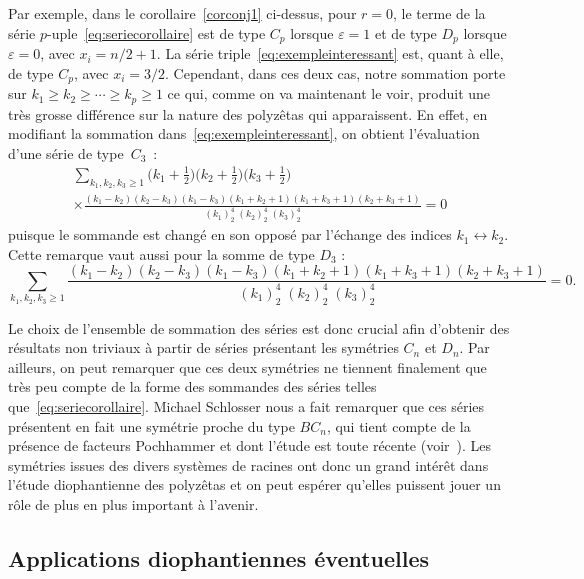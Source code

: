 \documentclass[12pt,francais, reqno]{smfart}
\numberwithin{equation}{section}
\begin{document}
Par exemple, dans le corollaire~\ref{corconj1} ci-dessus, pour $r=0$, le terme de
la s\'erie $p$-uple~\eqref{eq:seriecorollaire} est de type $C_p$ lorsque $\varepsilon=1$ et de type $D_p$ lorsque $\varepsilon=0$, avec $x_i=n/2+1$. La s\'erie triple~\eqref{eq:exempleinteressant} est, quant 
\`a elle, de type $C_p$, avec $x_i=3/2$.
Cependant, dans ces deux cas, notre sommation porte sur 
$k_1 \ge k_2\ge \cdots \ge k_p\ge 1$ ce qui, comme on va maintenant le voir, produit 
une tr\`es grosse diff\'erence sur la nature des polyz\^etas qui apparaissent. En effet, en modifiant la sommation dans~\eqref{eq:exempleinteressant}, on obtient l'\'evaluation d'une s\'erie de type~$C_3$~:
\begin{multline*}\label{eq:exempleinteressantbis}
\sum_{k_1, k_2, k_3\ge 1}\big(k_1+\frac12\big)\big(k_2+ \frac12\big)\big(k_3+\frac12\big) 
\\
\times \frac{(k_1-k_2)(k_2-k_3)(k_1-k_3)
(k_1+k_2+1)(k_1+k_3+1)(k_2+k_3+1)}{(k_1)_2^4\;(k_2)_2^4\;(k_3)_2^4}
= 0
\end{multline*}
puisque le sommande est chang\'e en son oppos\'e par l'\'echange des indices $k_1 \leftrightarrow k_2$. Cette remarque vaut aussi pour la somme de type $D_3$ :
\begin{equation*}
\sum_{k_1, k_2, k_3\ge 1}
\frac{(k_1-k_2)(k_2-k_3)(k_1-k_3)
(k_1+k_2+1)(k_1+k_3+1)(k_2+k_3+1)}{(k_1)_2^4\;(k_2)_2^4\;(k_3)_2^4}
= 0.
\end{equation*}

Le choix de l'ensemble de sommation des s\'eries est donc crucial afin d'obtenir des r\'esultats non 
triviaux \`a partir de  s\'eries pr\'esentant les sym\'etries $C_n$ et $D_n$. Par ailleurs, on peut remarquer que ces deux sym\'etries ne tiennent finalement que tr\`es peu compte de la forme des 
sommandes des s\'eries telles que~\eqref{eq:seriecorollaire}. 
Michael Schlosser nous a fait remarquer que ces s\'eries pr\'esentent en fait 
une sym\'etrie proche du type $BC_n$, qui tient compte de la pr\'esence de facteurs 
{\og Pochhammer\fg} et dont l'\'etude est toute r\'ecente (voir~\cite{coskun}). Les sym\'etries issues des divers syst\`emes de racines ont donc un grand int\'er\^et dans l'\'etude diophantienne des  polyz\^etas et on peut esp\'erer qu'elles puissent jouer un r\^ole de plus en plus  important \`a l'avenir.




\subsection{Applications diophantiennes \'eventuelles} \label{subsec23}
 
\end{document}
